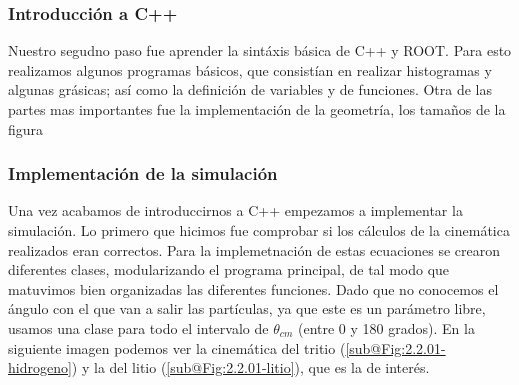 \documentclass[12pt,a4paper]{article}
\numberwithin{equation}{section}
\numberwithin{figure}{section}
\begin{document}
\subsubsection{Introducción a C++}

Nuestro segudno paso fue aprender la sintáxis básica de C++ y ROOT. Para esto realizamos algunos programas básicos, que consistían en realizar histogramas y algunas grásicas; así como la definición de variables y de funciones. Otra de las partes mas importantes fue la implementación de la geometría, los tamaños de la figura  \\

\subsubsection{Implementación de la simulación}

Una vez acabamos de introduccirnos a C++ empezamos a implementar la simulación. Lo primero que hicimos fue comprobar si los cálculos  de la cinemática realizados eran correctos. Para la implemetnación de estas ecuaciones se crearon diferentes clases, modularizando el programa principal, de tal modo que matuvimos bien organizadas las diferentes funciones. Dado que no conocemos el ángulo con el que van a salir las partículas, ya que este es un parámetro libre, usamos una clase para todo el intervalo de $\theta_{cm}$ (entre 0 y 180 grados). En la siguiente imagen podemos ver la cinemática del tritio (\ref{sub@Fig:2.2.01-hidrogeno}) y la del litio (\ref{sub@Fig:2.2.01-litio}), que es la de interés.   \\
\end{document}
